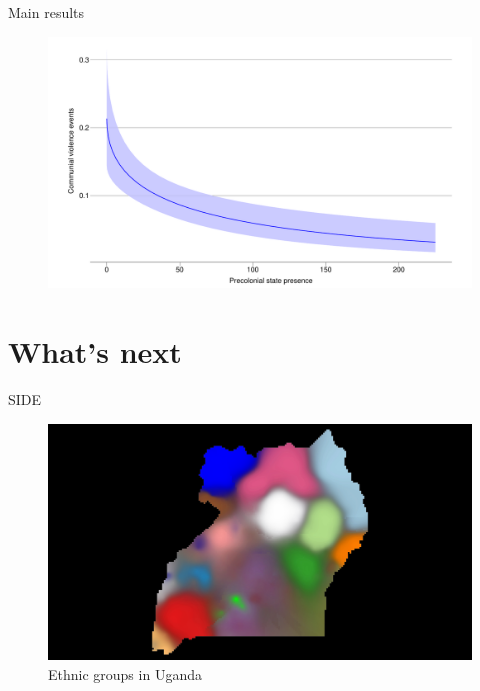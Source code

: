 \documentclass{beamer}
\begin{document}
\begin{frame}{Main results}

	\begin{figure}[htpb]
		\centering
		\includegraphics[width=0.8\linewidth]{../R/Output/CommunalViolenceMargins.pdf}
		\label{Margins}
	\end{figure}


\end{frame}

\section{What's next}

\begin{frame}{SIDE}

\begin{figure}[htpb]
	\centering
	\includegraphics[width=0.8\linewidth]{img/UGA illustration1.pdf}
	\caption{Ethnic groups in Uganda}%
	\label{SIDE1}
\end{figure}	

\end{frame}
\end{document}
